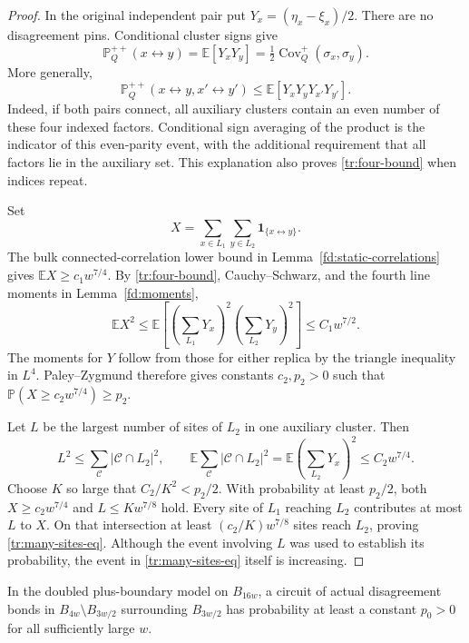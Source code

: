 \begin{proof}
In the original independent pair put $Y_x=(\eta_x-\xi_x)/2$. There are no
disagreement pins. Conditional cluster signs give
\begin{equation}
\label{tr:pair-identity}
 \mathbb P_Q^{++}(x\longleftrightarrow y)
 =\mathbb E[Y_xY_y]
 =\tfrac12\operatorname{Cov}_Q^+(\sigma_x,\sigma_y).
\end{equation}
More generally,
\begin{equation}
\label{tr:four-bound}
 \mathbb P_Q^{++}(x\longleftrightarrow y,
                  x'\longleftrightarrow y')
 \leq\mathbb E[Y_xY_yY_{x'}Y_{y'}].
\end{equation}
Indeed, if both pairs connect, all auxiliary clusters contain an even
number of these four indexed factors. Conditional sign averaging of the
product is the indicator of this even-parity event, with the additional
requirement that all factors lie in the auxiliary set. This explanation
also proves \eqref{tr:four-bound} when indices repeat.

Set
\[
 X=\sum_{x\in L_1}\sum_{y\in L_2}
        \mathbf1_{\{x\longleftrightarrow y\}}.
\]
The bulk connected-correlation lower bound in
Lemma~\ref{fd:static-correlations} gives $\mathbb EX\geq c_1w^{7/4}$.
By \eqref{tr:four-bound}, Cauchy--Schwarz, and the fourth line moments in
Lemma~\ref{fd:moments},
\[
 \mathbb EX^2
 \leq\mathbb E\left[
       \left(\sum_{L_1}Y_x\right)^2
       \left(\sum_{L_2}Y_y\right)^2\right]
 \leq C_1 w^{7/2}.
\]
The moments for $Y$ follow from those for either replica by the triangle
inequality in $L^4$. Paley--Zygmund therefore gives constants $c_2,p_2>0$
such that $\mathbb P(X\geq c_2w^{7/4})\geq p_2$.

Let $L$ be the largest number of sites of $L_2$ in one auxiliary cluster.
Then
\[
 L^2\leq\sum_{\mathcal C}|\mathcal C\cap L_2|^2,
 \qquad
 \mathbb E\sum_{\mathcal C}|\mathcal C\cap L_2|^2
 =\mathbb E\left(\sum_{L_2}Y_x\right)^2
 \leq C_2w^{7/4}.
\]
Choose $K$ so large that $C_2/K^2<p_2/2$. With probability at least
$p_2/2$, both $X\geq c_2w^{7/4}$ and $L\leq Kw^{7/8}$ hold. Every site
of $L_1$ reaching $L_2$ contributes at most $L$ to $X$. On that
intersection at least $(c_2/K)w^{7/8}$ sites reach $L_2$, proving
\eqref{tr:many-sites-eq}. Although the event involving $L$ was used to
establish its probability, the event in \eqref{tr:many-sites-eq} itself
is increasing.
\end{proof}

\begin{lemma}
\label{tr:circuit}
In the doubled plus-boundary model on $B_{16w}$, a circuit of actual
disagreement bonds in $B_{4w}\setminus B_{3w/2}$ surrounding $B_{3w/2}$ has
probability at least a constant $p_0>0$ for all sufficiently large $w$.
\end{lemma}

